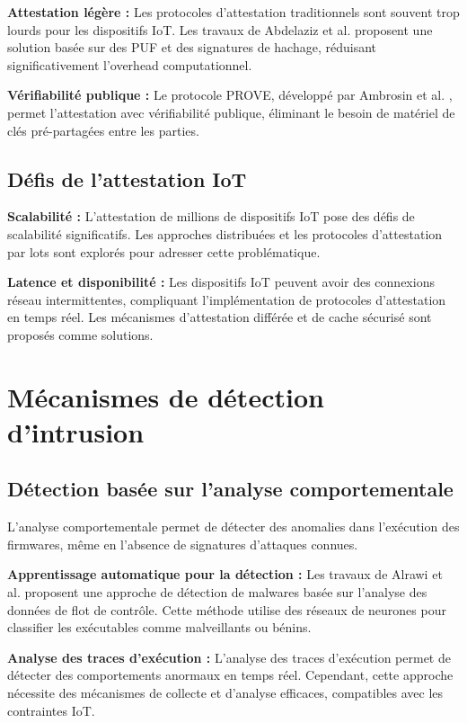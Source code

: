 \textbf{Attestation légère :} Les protocoles d'attestation traditionnels sont souvent trop lourds pour les dispositifs IoT. Les travaux de Abdelaziz et al. \cite{Abdelaziz2024LightweightRemote} proposent une solution basée sur des PUF et des signatures de hachage, réduisant significativement l'overhead computationnel.

\textbf{Vérifiabilité publique :} Le protocole PROVE, développé par Ambrosin et al. \cite{Ambrosin2024PROVE}, permet l'attestation avec vérifiabilité publique, éliminant le besoin de matériel de clés pré-partagées entre les parties.

\subsection{Défis de l'attestation IoT}

\textbf{Scalabilité :} L'attestation de millions de dispositifs IoT pose des défis de scalabilité significatifs. Les approches distribuées et les protocoles d'attestation par lots sont explorés pour adresser cette problématique.

\textbf{Latence et disponibilité :} Les dispositifs IoT peuvent avoir des connexions réseau intermittentes, compliquant l'implémentation de protocoles d'attestation en temps réel. Les mécanismes d'attestation différée et de cache sécurisé sont proposés comme solutions.

\section{Mécanismes de détection d'intrusion}

\subsection{Détection basée sur l'analyse comportementale}

L'analyse comportementale permet de détecter des anomalies dans l'exécution des firmwares, même en l'absence de signatures d'attaques connues.

\textbf{Apprentissage automatique pour la détection :} Les travaux de Alrawi et al. \cite{Alrawi2023MachineLearning} proposent une approche de détection de malwares basée sur l'analyse des données de flot de contrôle. Cette méthode utilise des réseaux de neurones pour classifier les exécutables comme malveillants ou bénins.

\textbf{Analyse des traces d'exécution :} L'analyse des traces d'exécution permet de détecter des comportements anormaux en temps réel. Cependant, cette approche nécessite des mécanismes de collecte et d'analyse efficaces, compatibles avec les contraintes IoT.

